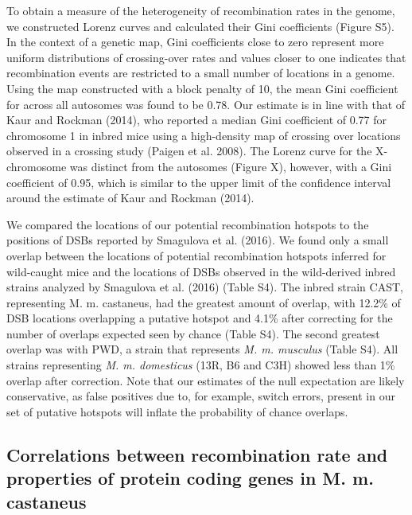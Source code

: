 	To obtain a measure of the heterogeneity of recombination rates in the genome, we constructed Lorenz curves and calculated their Gini coefficients (Figure S5). In the context of a genetic map, Gini coefficients close to zero represent more uniform distributions of crossing-over rates and values closer to one indicates that recombination events are restricted to a small number of locations in a genome. Using the map constructed with a block penalty of 10, the mean Gini coefficient for across all autosomes was found to be 0.78. Our estimate is in line with that of Kaur and Rockman (2014), who reported a median Gini coefficient of 0.77 for chromosome 1 in inbred mice using a high-density map of crossing over locations observed in a crossing study (Paigen et al. 2008). The Lorenz curve for the X-chromosome was distinct from the autosomes (Figure X), however, with a Gini coefficient of 0.95, which is similar to the upper limit of the confidence interval around the estimate of Kaur and Rockman (2014). 

We compared the locations of our potential recombination hotspots to the positions of DSBs reported by Smagulova et al. (2016). We found only a small overlap between the locations of potential recombination hotspots inferred for wild-caught mice and the locations of DSBs observed in the wild-derived inbred strains analyzed by Smagulova et al. (2016) (Table S4). The inbred strain CAST, representing M. m. castaneus, had the greatest amount of overlap, with 12.2\% of DSB locations overlapping a putative hotspot and 4.1\% after correcting for the number of overlaps expected seen by chance (Table S4). The second greatest overlap was with PWD, a strain that represents \emph{M. m. musculus} (Table S4). All strains representing \emph{M. m. domesticus} (13R, B6 and C3H) showed less than 1\% overlap after correction. Note that our estimates of the null expectation are likely conservative, as false positives due to, for example, switch errors, present in our set of putative hotspots will inflate the probability of chance overlaps. 

\subsection{Correlations between recombination rate and properties of protein coding genes in M. m. castaneus}

